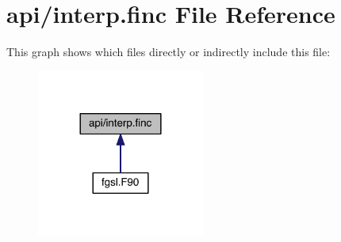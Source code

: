 \hypertarget{interp_8finc}{\section{api/interp.finc File Reference}
\label{interp_8finc}
}
This graph shows which files directly or indirectly include this file\-:\nopagebreak
\begin{figure}[H]
\begin{center}
\leavevmode
\includegraphics[width=156pt]{interp_8finc__dep__incl}
\end{center}
\end{figure}

